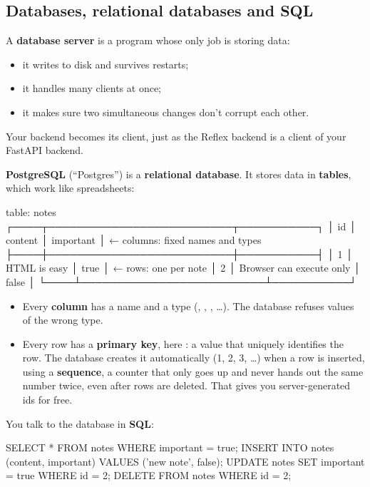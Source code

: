 \subsection{Databases, relational databases and SQL}

A \textbf{database server} is a program whose only job is storing data:
\begin{itemize}
\item it writes to disk and survives restarts;
\item it handles many clients at once;
\item it makes sure two simultaneous changes don't corrupt each other.
\end{itemize}

Your backend becomes its client, just as the Reflex backend is a client of your FastAPI backend.

\textbf{PostgreSQL} (``Postgres'') is a \textbf{relational database}. It stores data in \textbf{tables}, which work like spreadsheets:

\begin{code}
table: notes
┌────┬──────────────────────────┬───────────┐
│ id │ content                  │ important │   ← columns: fixed names and types
├────┼──────────────────────────┼───────────┤
│  1 │ HTML is easy             │ true      │   ← rows: one per note
│  2 │ Browser can execute only │ false     │
└────┴──────────────────────────┴───────────┘
\end{code}

\begin{itemize}
\item Every \textbf{column} has a name and a type (, , , \ldots). The database refuses values of the wrong type.
\item Every row has a \textbf{primary key}, here : a value that uniquely identifies the row. The database creates it automatically (1, 2, 3, \ldots) when a row is inserted, using a \textbf{sequence}, a counter that only goes up and never hands out the same number twice, even after rows are deleted. That gives you server-generated ids for free.
\end{itemize}

You talk to the database in \textbf{SQL}:

\begin{code}
SELECT * FROM notes WHERE important = true;
INSERT INTO notes (content, important) VALUES ('new note', false);
UPDATE notes SET important = true WHERE id = 2;
DELETE FROM notes WHERE id = 2;
\end{code}

